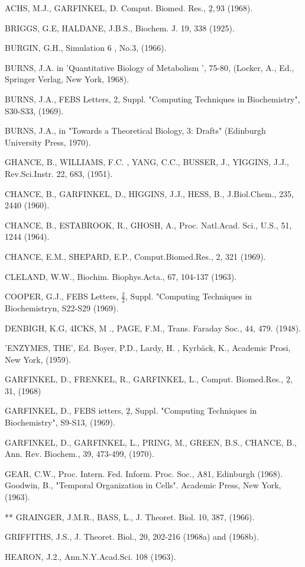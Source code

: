 \documentclass[11pt]{book}
\begin{document}
{\small
ACHS, M.J., GARFINKEL, D. Comput. Biomed. Res., $\underline{2}, 93$ (1968).

BRIGGS, G.E, HALDANE, J.B.S., Biochem. J. 19, 338 (1925).

BURGIN, G.H., Simulation 6 , No.3, (1966).

BURNS, J.A. in 'Quantitative Biology of Metabolism ', 75-80, (Locker, A., Ed., Springer Verlag, New York, 1968).

BURNS, J.A., FEBS Letters, 2, Suppl. "Computing Techniques in Biochemistry", S30-S33, (1969).

BURNS, J.A., in "Towards a Theoretical Biology, 3: Drafts" (Edinburgh University Press, 1970).

GHANCE, B., WILLIAMS, F.C. , YANG, C.C., BUSSER, J., YIGGINS, J.J., Rev.Sci.Instr. 22, 683, (1951).

CHANCE, B., GARFINKEL, D., HIGGINS, J.J., HESS, B., J.Biol.Chem., 235, 2440 (1960).

CHANCE, B., ESTABROOK, R., GHOSH, A., Proc. Natl.Acad. Sci., U.S., 51, 1244 (1964).

CHANCE, E.M., SHEPARD, E.P., Comput.Biomed.Res., 2, 321 (1969).

CLELAND, W.W., Biochim. Biophys.Acta., 67, 104-137 (1963).

COOPER, G.J., FEBS Letters, $\frac{2}{2}$, Suppl. "Computing Techniques in Biochemistryn, S22-S29 (1969).

DENBIGH, K.G, 4ICKS, M ., PAGE, F.M., Trans. Faraday Soc., 44, 479. (1948).

'ENZYMES, THE', Ed. Boyer, P.D., Lardy, H. , Kyrbäck, K., Academic Prosi, New York, (1959).

GARFINKEL, D., FRENKEL, R., GARFINKEL, L., Comput. Biomed.Res., $\underline{2}$, 31, (1968)

GARFINKEL, D., FEBS ietters, $\underline{2}$, Suppl. "Computing Techniques in Biochemistry", S9-S13, (1969).

GARFINKEL, D., GARFINKEL, L., PRING, M., GREEN, B.S., CHANCE, B., Ann. Rev. Biochem., 39, 473-499, (1970).

GEAR, C.W., Proc. Intern. Fed. Inform. Proc. Soc., A81, Edinburgh (1968). Goodwin, B., "Temporal Organization in Cells". Academic Press, New York, (1963).

** GRAINGER, J.M.R., BASS, L., J. Theoret. Biol. 10, 387, (1966).

GRIFFITHS, J.S., J. Theoret. Biol., 20, 202-216 (1968a) and (1968b).

HEARON, J.2., Ann.N.Y.Acad.Sci. 108 (1963).

}
\end{document}
